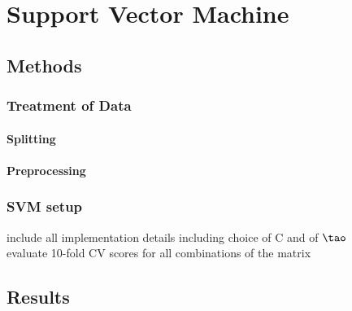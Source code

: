 \section{Support Vector Machine}

\subsection{Methods}

\subsubsection{Treatment of Data}

\paragraph{Splitting}

\paragraph{Preprocessing}

\subsubsection{SVM setup}
include all implementation details including choice of C and of $\tao$\\
evaluate 10-fold CV scores for all combinations of the matrix

\subsection{Results}